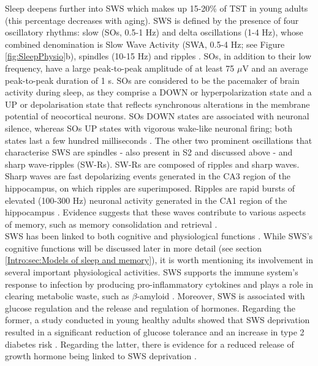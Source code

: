 Sleep deepens further into SWS which makes up 15-20\% of TST in young adults (this percentage decreases with aging). SWS is defined by the presence of four oscillatory rhythms: slow (SOs, 0.5-1 Hz) and delta oscillations (1-4 Hz), whose combined denomination is Slow Wave Activity (SWA, 0.5-4 Hz; see Figure \ref{fig:SleepPhysio}b), spindles (10-15 Hz) and ripples \parencite{iber_aasm_2007}. SOs, in addition to their low frequency, have a large peak-to-peak amplitude of at least 75 \(\mu\)V and an average peak-to-peak duration of 1 s. SOs are considered to be the pacemaker of brain activity during sleep, as they comprise a DOWN or hyperpolarization state and a UP or depolarisation state that reflects synchronous alterations in the membrane potential of neocortical neurons. SOs DOWN states are associated with neuronal silence, whereas SOs UP states with vigorous wake-like neuronal firing; both states last a few hundred milliseconds \parencite{massimini_sleep_2004,molle_fast_2011,nir_regional_2011}.
The other two prominent oscillations that characterise SWS are spindles - also present in S2 and discussed above - and sharp wave-ripples (SW-Rs). SW-Rs are composed of ripples and sharp waves. Sharp waves are fast depolarizing events generated in the CA3 region of the hippocampus, on which ripples are superimposed. Ripples are rapid bursts of elevated (100-300 Hz) neuronal activity generated in the CA1 region of the hippocampus \parencite{buzsaki_hippocampal_1986, rasch_about_2013}. Evidence suggests that these waves contribute to various aspects of memory, such as memory consolidation and retrieval \parencite{buzsaki_hippocampal_1986}.\\
SWS has been linked to both cognitive and physiological functions \parencite{leger_slow-wave_2018}. While SWS’s cognitive functions will be discussed later in more detail (see section \ref{Intro:sec:Models of sleep and memory}), it is worth mentioning its involvement in several important physiological activities. SWS supports the immune system’s response to infection by producing pro-inflammatory cytokines \parencite{lange_effects_2010} and plays a role in clearing metabolic waste, such as \(\beta\)-amyloid \parencite{leger_slow-wave_2018}. Moreover, SWS is associated with glucose regulation and the release and regulation of hormones. Regarding the former, a study conducted in young healthy adults showed that SWS deprivation resulted in a significant reduction of glucose tolerance and an increase in type 2 diabetes risk \parencite{tasali_sciences_2008}. Regarding the latter, there is evidence for a reduced release of growth hormone being linked to SWS deprivation \parencite[e.g.,][]{van_cauter_metabolic_2008}.

